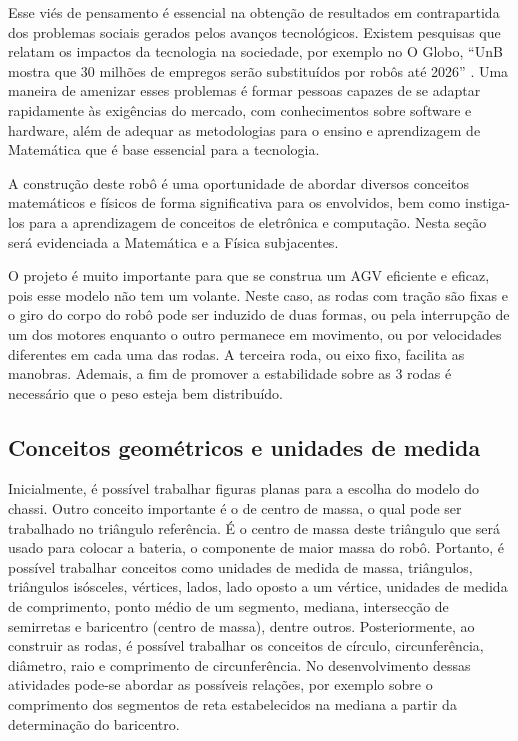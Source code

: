 \documentclass{textolivre-html}
\begin{document}
Esse viés de pensamento é essencial na obtenção de resultados em contrapartida
dos problemas sociais gerados pelos avanços tecnológicos. Existem pesquisas que
relatam os impactos da tecnologia na sociedade, por exemplo no O Globo, “UnB
mostra que 30 milhões de empregos serão substituídos por robôs até 2026”
\cite{carvalho2019}. Uma maneira de amenizar esses problemas é formar pessoas
capazes de se adaptar rapidamente às exigências do mercado, com conhecimentos
sobre software e hardware, além de adequar as metodologias para o ensino e
aprendizagem de Matemática que é base essencial para a tecnologia.

A construção deste robô é uma oportunidade de abordar diversos conceitos
matemáticos e físicos de forma significativa para os envolvidos, bem como
instiga-los para a aprendizagem de conceitos de eletrônica e computação. Nesta
seção será evidenciada a Matemática e a Física subjacentes.

O projeto é muito importante para que se construa um AGV eficiente e eficaz,
pois esse modelo não tem um volante. Neste caso, as rodas com tração são fixas
e o giro do corpo do robô pode ser induzido de duas formas, ou pela interrupção
de um dos motores enquanto o outro permanece em movimento, ou por velocidades
diferentes em cada uma das rodas. A terceira roda, ou eixo fixo, facilita as
manobras. Ademais, a fim de promover a estabilidade sobre as 3 rodas é
necessário que o peso esteja bem distribuído.


\subsection{Conceitos geométricos e unidades de medida}\label{sec-conceitos}
Inicialmente, é possível trabalhar figuras planas para a escolha do modelo do
chassi. Outro conceito importante é o de centro de massa, o qual pode ser
trabalhado no triângulo referência. É o centro de massa deste triângulo que
será usado para colocar a bateria, o componente de maior massa do robô.
Portanto, é possível trabalhar conceitos como unidades de medida de massa,
triângulos, triângulos isósceles, vértices, lados, lado oposto a um vértice,
unidades de medida de comprimento, ponto médio de um segmento, mediana,
intersecção de semirretas e baricentro (centro de massa), dentre outros.
Posteriormente, ao construir as rodas, é possível trabalhar os conceitos de
círculo, circunferência, diâmetro, raio e comprimento de circunferência. No
desenvolvimento dessas atividades pode-se abordar as possíveis relações, por
exemplo sobre o comprimento dos segmentos de reta estabelecidos na mediana a
partir da determinação do baricentro.
\end{document}
